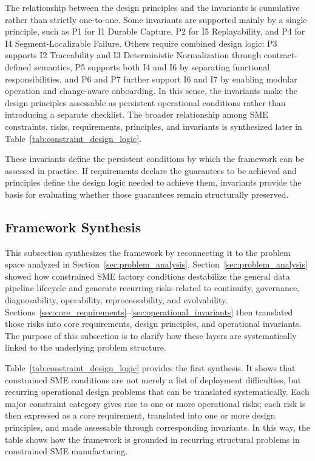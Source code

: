 \documentclass[systems,article,accept,pdftex,moreauthors]{Definitions/mdpi}
\begin{document}
The relationship between the design principles and the invariants is cumulative rather than strictly one-to-one. Some invariants are supported mainly by a single principle, such as P1 for I1 Durable Capture, P2 for I5 Replayability, and P4 for I4 Segment-Localizable Failure. Others require combined design logic: P3 supports I2 Traceability and I3 Deterministic Normalization through contract-defined semantics, P5 supports both I4 and I6 by separating functional responsibilities, and P6 and P7 further support I6 and I7 by enabling modular operation and change-aware onboarding. In this sense, the invariants make the design principles assessable as persistent operational conditions rather than introducing a separate checklist. The broader relationship among SME constraints, risks, requirements, principles, and invariants is synthesized later in Table~\ref{tab:constraint_design_logic}.

These invariants define the persistent conditions by which the framework can be assessed in practice. If requirements declare the guarantees to be achieved and principles define the design logic needed to achieve them, invariants provide the basis for evaluating whether those guarantees remain structurally preserved.

\subsection{Framework Synthesis}
\label{sec:framework_synthesis}

This subsection synthesizes the framework by reconnecting it to the problem space analyzed in Section~\ref{sec:problem_analysis}. Section~\ref{sec:problem_analysis} showed how constrained SME factory conditions destabilize the general data pipeline lifecycle and generate recurring risks related to continuity, governance, diagnosability, operability, reprocessability, and evolvability. Sections~\ref{sec:core_requirements}--\ref{sec:operational_invariants} then translated those risks into core requirements, design principles, and operational invariants. The purpose of this subsection is to clarify how these layers are systematically linked to the underlying problem structure.

Table~\ref{tab:constraint_design_logic} provides the first synthesis. It shows that constrained SME conditions are not merely a list of deployment difficulties, but recurring operational design problems that can be translated systematically. Each major constraint category gives rise to one or more operational risks; each risk is then expressed as a core requirement, translated into one or more design principles, and made assessable through corresponding invariants. In this way, the table shows how the framework is grounded in recurring structural problems in constrained SME manufacturing.
\end{document}
